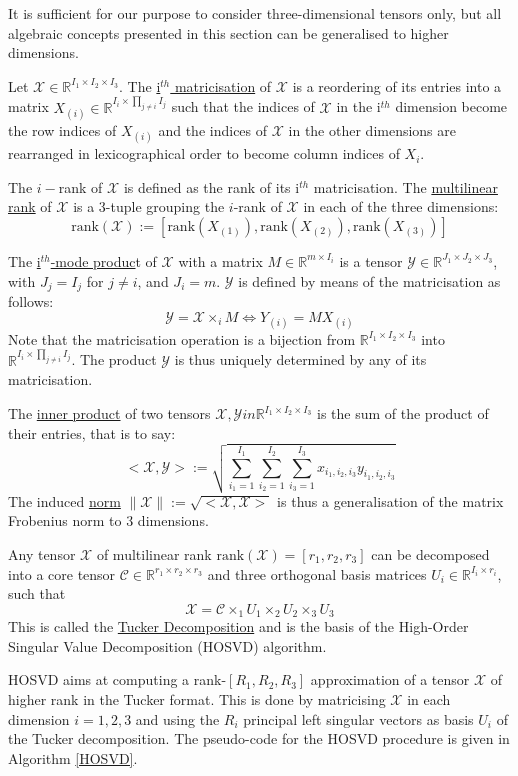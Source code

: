 \documentclass[a4paper, 11pt]{article} %
\def \be {\begin{equation*}}
\def \ee {\end{equation*}}
\def \X {\mathcal{X}}
\def \R {\mathbb{R}}
\def \t {\times}
\def \rank{\mbox{rank}}
\def \Y {\mathcal{Y}}
\def \C {\mathcal{C}}
\begin{document}
It is sufficient for our purpose to consider three-dimensional tensors only, but all algebraic concepts presented in this section can be generalised to higher dimensions.

Let $\X \in \R^{I_1\t I_2 \t I_3}$.
The \underline{i$^{th}$ matricisation} of $\X$ is a reordering of its entries into a matrix $X_{(i)} \in \R^{ I_i\t \prod_{j\neq i}I_j}$ such that the indices of $\X$ in the i$^{th}$ dimension become the row indices of $X_{(i)}$ and the indices of $\X$ in the other dimensions are rearranged in lexicographical order to become column indices of $X_{i}$. 

The $i-$rank of $\X$ is defined as the rank of its i$^{th}$ matricisation. The \underline{multilinear rank} of $\X$ is a 3-tuple grouping the $i$-rank of $\X$ in each of the three dimensions:
\be
\rank(\X):=\left[\rank(X_{(1)}),  \rank(X_{(2)}), \rank(X_{(3)})\right]
\ee

The \underline{i$^{th}$-mode produc}t of $\X$ with a matrix $M \in \R^{m\t I_i}$ is a tensor $\mathcal{Y} \in \R^{J_1\t J_2\t J_3}$, with $J_j=I_j$ for $j\neq i$, and $J_i=m$. $\mathcal{Y}$ is defined by means of the matricisation as follows:
\be
\mathcal{Y}=\X \t_{i} M \iff Y_{(i)}=MX_{(i)}
\ee
Note that the matricisation operation is a bijection from $ \R^{I_1\t I_2 \t I_3}$ into $\R^{ I_i\t \prod_{j\neq i}I_j}$. The product $\mathcal{Y}$ is thus uniquely determined by any of its matricisation.

The \underline{inner product} of two tensors $\X, \Y in \R^{I_1\t I_2 \t I_3}$ is the sum of the product of their entries, that is to say:
\be
<\X,\Y>:=\sqrt{\sum\limits_{i_1=1}^{I_1}\sum\limits_{i_2=1}^{I_2}\sum\limits_{i_3=1}^{I_3} x_{i_1,i_2,i_3}y_{i_1,i_2,i_3}}
\ee 
The induced \underline{norm} $\|\X\|:=\sqrt{<\X, \X>}$ is thus a generalisation of the matrix Frobenius norm to 3 dimensions.

Any tensor $\X$ of multilinear rank $\rank(\X)=[r_1, r_2, r_3]$ can be decomposed into a core tensor $\C \in \R^{r_1\t r_2 \t r_3}$ and three orthogonal basis matrices $U_i \in \R^{I_i\t r_i}$, such that
\be
\X=\C \t_1 U_1 \t_2 U_2 \t_3 U_3 
\ee 
This is called the \underline{Tucker Decomposition} and is the basis of the {High-Order Singular Value Decomposition} (HOSVD) algorithm. 

HOSVD aims at computing a rank-$\left[R_1,R_2, R_3\right]$ approximation of a tensor $\X$ of higher rank in the Tucker format. This is done by matricising $\X$ in each dimension $i=1,2,3$ and using the $R_i$ principal left singular vectors as basis $U_i$ of the Tucker decomposition. The pseudo-code for the HOSVD procedure is given in Algorithm \autoref{HOSVD}.
\end{document}
